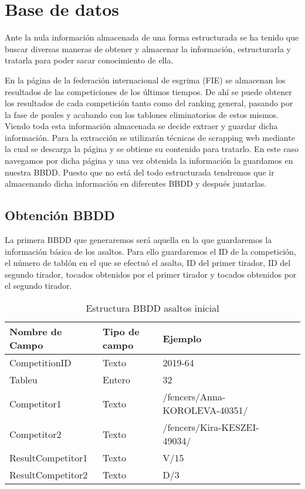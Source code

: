 \section{Base de datos}

Ante la nula información almacenada de una forma estructurada se ha tenido que buscar
 diversas maneras de obtener y almacenar la información, estructurarla y tratarla para
 poder sacar conocimiento de ella.

En la página de la federación internacional de esgrima (FIE) se almacenan los resultados
 de las competiciones de los últimos tiempos. De ahí se puede obtener los resultados
 de cada competición tanto como del ranking general, pasando por la fase de poules
 y acabando con los tablones eliminatorios de estos mismos. Viendo toda esta información
 almacenada se decide extraer y guardar dicha información. Para la extracción se
 utilizarán técnicas de scrapping web mediante la cual se descarga la página y se
 obtiene su contenido para tratarlo. En este caso navegamos por dicha página y una
 vez obtenida la información la guardamos en nuestra BBDD. Puesto que no está del
 todo estructurada tendremos que ir almacenando dicha información en diferentes BBDD
 y después juntarlas.

\subsection{Obtención BBDD}

La primera BBDD que generaremos será aquella en la que guardaremos la información
 básica de los asaltos. Para ello guardaremos el ID de la competición, el número
 de tablón en el que se efectuó el asalto, ID del primer tirador, ID del segundo
 tirador, tocados obtenidos por el primer tirador y tocados obtenidos por
 el segundo tirador.

\begin{table}[htb]%
  \centering
  \caption{Estructura BBDD asaltos inicial}
  \label{tab:anchura}
  \begin{tabular}{ | l | l | l | l | l | l | }
    \hline
    Nombre de Campo & Tipo de campo & Ejemplo \\ \hline
    CompetitionID & Texto & 2019-64 \\ \hline
    Tableu & Entero & 32 \\ \hline
    Competitor1 & Texto & /fencers/Anna-KOROLEVA-40351/ \\ \hline
    Competitor2 & Texto & /fencers/Kira-KESZEI-49034/ \\ \hline
    ResultCompetitor1 & Texto & V/15 \\ \hline
    ResultCompetitor2 & Texto & D/3 \\
    \hline
  \end{tabular}
\end{table}


